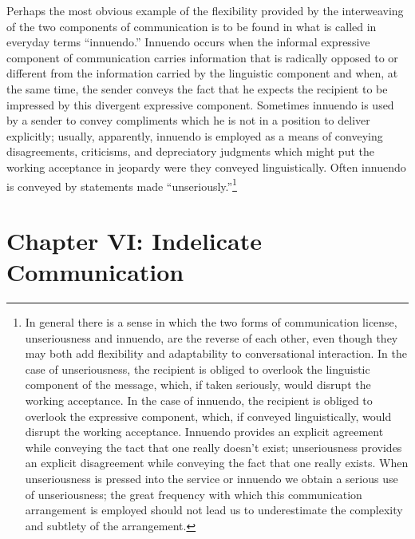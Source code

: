 \documentclass[openany,nobib]{tufte-book}
\let\oldchapter\chapter
\def\chapter{%
  \setcounter{footnote}{0}%
  \oldchapter
}
\begin{document}
Perhaps the most obvious example of the flexibility pro­vided by the
interweaving of the two components of communication is to be found in
what is called in everyday terms ``innuendo.'' Innuendo occurs when the
informal expressive component of communication carries information that
is radically opposed to or different from the information carried by the
linguistic component and when, at the same time, the sender conveys the
fact that he expects the recipient to be impressed by this divergent
expressive component. Sometimes innuendo is used by a sender to convey
compliments which he is not in a position to deliver explicitly;
usually, apparently, innuendo is employed as a means of conveying
disagreements, criticisms, and depreciatory judg­ments which might put
the working acceptance in jeopardy were they conveyed linguistically.
Often innuendo is conveyed by statements made
``unseriously.''\footnote{In general there is a sense in which the two
  forms of communication license, unseriousness and innuendo, are the
  re­verse of each other, even though they may both add flexibility and
  adaptability to conversational interaction. In the case of
  unseriousness, the recipient is obliged to overlook the lin­guistic
  component of the message, which, if taken seriously, would disrupt the
  working acceptance. In the case of innuendo, the recipient is obliged
  to overlook the expressive component, which, if conveyed
  linguistically, would disrupt the working acceptance. Innuendo
  provides an explicit agreement while con­veying the tact that one
  really doesn't exist; unseriousness provides an explicit disagreement
  while conveying the fact that one really exists. When unseriousness is
  pressed into the serv­ice or innuendo we obtain a serious use of
  unseriousness; the great frequency with which this communication
  arrangement is em­ployed should not lead us to underestimate the
  complexity and subtlety of the arrangement.}



\chapter[CHAPTER VI: INDELICATE COMMUNICATION]{Chapter VI: Indelicate Communication}
\label{ch:Chapter VI: Indelicate Communication}

\enlargethispage{\baselineskip}
\end{document}
